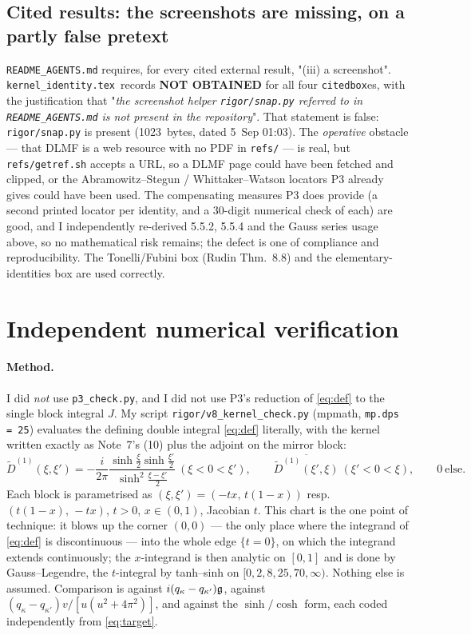 \documentclass[11pt]{article}
\newcommand{\Dt}{\widetilde D^{(1)}}\newcommand{\Qt}{\widetilde Q}
\newcommand{\KI}{\texttt{kernel\_identity.tex}}\newcommand{\NOTE}{\texttt{universality\_normalization.tex}}
\begin{document}
\subsection{Cited results: the screenshots are missing, on a partly false pretext}
\texttt{README\_AGENTS.md} requires, for every cited external result, "(iii) a screenshot".  \KI\
records \textbf{NOT OBTAINED} for all four \texttt{citedbox}es, with the justification that
"\emph{the screenshot helper \texttt{rigor/snap.py} referred to in \texttt{README\_AGENTS.md} is
not present in the repository}".  That statement is false: \texttt{rigor/snap.py} is present
(1023~bytes, dated 5~Sep 01:03).  The \emph{operative} obstacle --- that DLMF is a web resource
with no PDF in \texttt{refs/} --- is real, but \texttt{refs/getref.sh} accepts a URL, so a DLMF
page could have been fetched and clipped, or the Abramowitz--Stegun / Whittaker--Watson locators
P3 already gives could have been used.  The compensating measures P3 does provide (a second
printed locator per identity, and a 30-digit numerical check of each) are good, and I independently
re-derived 5.5.2, 5.5.4 and the Gauss series usage above, so no mathematical risk remains; the
defect is one of compliance and reproducibility.  The Tonelli/Fubini box (Rudin Thm.~8.8) and the
elementary-identities box are used correctly.

\section{Independent numerical verification}\label{sec:num}

\paragraph{Method.}  I did \emph{not} use \texttt{p3\_check.py}, and I did not use P3's reduction of
\eqref{eq:def} to the single block integral \(J\).  My script
\texttt{rigor/v8\_kernel\_check.py} (mpmath, \texttt{mp.dps = 25}) evaluates the defining double
integral \eqref{eq:def} literally, with the kernel written exactly as Note~7's (10) plus the
adjoint on the mirror block:
\[
 \Dt(\xi,\xi')=-\frac i{2\pi}\frac{\sinh\frac\xi2\sinh\frac{\xi'}2}{\sinh^2\frac{\xi-\xi'}2}
 \ (\xi<0<\xi'),\qquad \overline{\Dt(\xi',\xi)}\ (\xi'<0<\xi),\qquad 0\ \text{else}.
\]
Each block is parametrised as \((\xi,\xi')=(-tx,\,t(1-x))\) resp.\ \((t(1-x),\,-tx)\), \(t>0\),
\(x\in(0,1)\), Jacobian \(t\).  This chart is the one point of technique: it blows up the corner
\((0,0)\) --- the only place where the integrand of \eqref{eq:def} is discontinuous --- into the
whole edge \(\{t=0\}\), on which the integrand extends continuously; the \(x\)-integrand is then
analytic on \([0,1]\) and is done by Gauss--Legendre, the \(t\)-integral by tanh--sinh on
\([0,2,8,25,70,\infty)\).  Nothing else is assumed.  Comparison is against
\(i(q_\kappa-q_{\kappa'})\mathfrak g\), against \((q_\kappa-q_{\kappa'})v/[u(u^2+4\pi^2)]\), and against
the \(\sinh/\cosh\) form, each coded independently from \eqref{eq:target}.
\end{document}
